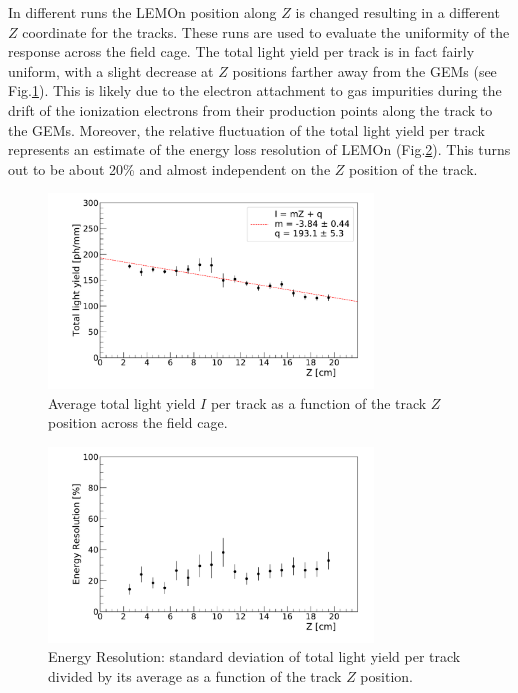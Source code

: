 \documentclass[%
 aip,
 amsmath,amssymb,
 reprint,%
]{revtex4-1}
\begin{document}
 In different runs the LEMOn position along $Z$ is changed resulting in a different $Z$ coordinate for the tracks. These runs  are used to evaluate the uniformity of the response across the field cage. The total light yield  per track is in fact  fairly uniform,  with a slight decrease at  $Z$ positions farther away  from the GEMs (see Fig.\ref{fig:lightvsZ}). This is likely due to the electron attachment to gas impurities during the drift of  the ionization electrons from their production points along the track to the GEMs.
  Moreover, the relative fluctuation of the total light yield per track represents an estimate of the energy loss resolution of LEMOn (Fig.\ref{fig:energyresvsZ}). This turns out to be about 20\% and almost independent on the $Z$ position of the track.
 
 \begin{figure}[!ht]
\centering
\includegraphics[width=3.4in]{Fig6-Photons-Z.pdf}
\caption{Average total light yield $I$ per track as a function of the track $Z$ position across the field cage.}
\label{fig:lightvsZ}
\end{figure}

  \begin{figure}[!ht]
\centering
\includegraphics[width=3.4in]{Fig7-EnergyResultion-Z.pdf}
\caption{Energy Resolution: standard deviation of total light yield  per track divided by its average as a function of the track $Z$ position.}
\label{fig:energyresvsZ}
\end{figure}
\end{document}
